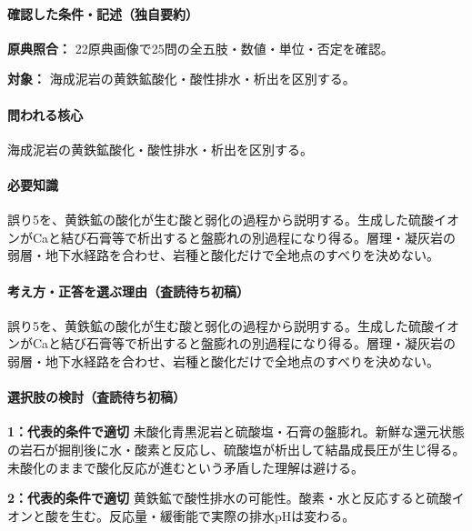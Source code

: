 \paragraph{確認した条件・記述（独自要約）}\mbox{}\par

\noindent\textbf{原典照合：} 22原典画像で25問の全五肢・数値・単位・否定を確認。\par

\noindent\textbf{対象：} 海成泥岩の黄鉄鉱酸化・酸性排水・析出を区別する。\par

\paragraph{問われる核心} 海成泥岩の黄鉄鉱酸化・酸性排水・析出を区別する。

\paragraph{必要知識} 誤り5を、黄鉄鉱の酸化が生む酸と弱化の過程から説明する。生成した硫酸イオンがCaと結び石膏等で析出すると盤膨れの別過程になり得る。層理・凝灰岩の弱層・地下水経路を合わせ、岩種と酸化だけで全地点のすべりを決めない。

\paragraph{考え方・正答を選ぶ理由（査読待ち初稿）} 誤り5を、黄鉄鉱の酸化が生む酸と弱化の過程から説明する。生成した硫酸イオンがCaと結び石膏等で析出すると盤膨れの別過程になり得る。層理・凝灰岩の弱層・地下水経路を合わせ、岩種と酸化だけで全地点のすべりを決めない。

\paragraph{選択肢の検討（査読待ち初稿）}\mbox{}\par

\noindent\textbf{1：代表的条件で適切} 未酸化青黒泥岩と硫酸塩・石膏の盤膨れ。新鮮な還元状態の岩石が掘削後に水・酸素と反応し、硫酸塩が析出して結晶成長圧が生じ得る。未酸化のままで酸化反応が進むという矛盾した理解は避ける。\par

\noindent\textbf{2：代表的条件で適切} 黄鉄鉱で酸性排水の可能性。酸素・水と反応すると硫酸イオンと酸を生む。反応量・緩衝能で実際の排水pHは変わる。\par

